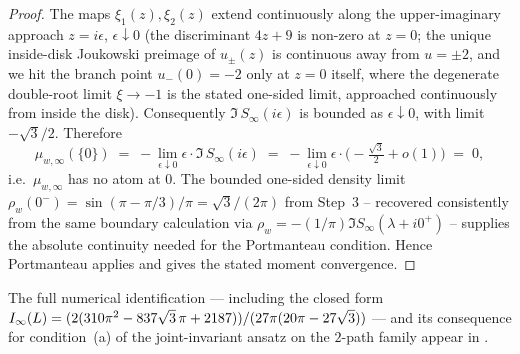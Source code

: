 \begin{proof}
The maps $\xi_{1}(z), \xi_{2}(z)$ extend continuously along the
upper-imaginary approach $z = i\epsilon$, $\epsilon \downarrow 0$
(the discriminant $4z + 9$ is non-zero at $z = 0$; the unique
inside-disk Joukowski preimage of $u_{\pm}(z)$ is continuous away
from $u = \pm 2$, and we hit the branch point $u_{-}(0) = -2$ only at
$z = 0$ itself, where the degenerate double-root limit $\xi \to -1$ is
the stated one-sided limit, approached continuously from inside the
disk). Consequently $\Im\, S_{\infty}(i\epsilon)$ is bounded as
$\epsilon \downarrow 0$, with limit $-\sqrt{3}/2$. Therefore
\[
\mu_{w, \infty}(\{0\})
\;=\; -\lim_{\epsilon \downarrow 0} \epsilon \cdot
\Im\, S_{\infty}(i\epsilon)
\;=\; -\lim_{\epsilon \downarrow 0} \epsilon \cdot
\bigl(-\tfrac{\sqrt{3}}{2} + o(1)\bigr)
\;=\; 0,
\]
i.e.\ $\mu_{w, \infty}$ has no atom at $0$. The bounded one-sided
density limit
$\rho_{w}(0^{-}) = \sin(\pi - \pi/3)/\pi = \sqrt{3}/(2\pi)$ from
Step~3 -- recovered consistently from the same boundary calculation
via $\rho_{w} = -(1/\pi)\Im S_{\infty}(\lambda + i 0^{+})$ -- supplies
the absolute continuity needed for the Portmanteau condition. Hence
Portmanteau applies and gives the stated moment convergence.
\end{proof}

The full numerical identification — including the closed form
$I_{\infty}(L) = (2(310\pi^{2} - 837\sqrt{3}\,\pi + 2187))/(27\pi(20\pi -
27\sqrt{3}))$ — and its consequence for condition~(a) of the
joint-invariant ansatz on the $2$-path family appear in
.
